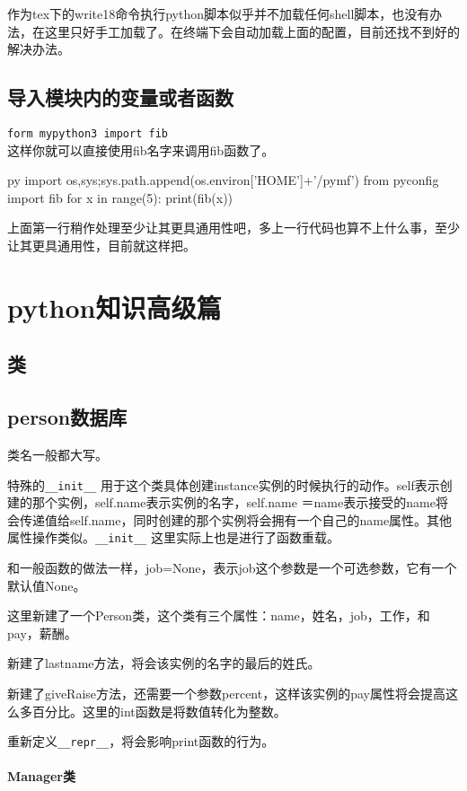 \documentclass[12pt,oneside]{book}
\begin{document}
\begin{common-format}
作为tex下的write18命令执行python脚本似乎并不加载任何shell脚本，也没有办法，在这里只好手工加载了。在终端下会自动加载上面的配置，目前还找不到好的解决办法。


\section{导入模块内的变量或者函数}
\verb+form mypython3 import fib+\\
这样你就可以直接使用fib名字来调用fib函数了。
\begin{xverbatim}[129]{py}
import os,sys;sys.path.append(os.environ['HOME']+'/pymf')
from pyconfig import fib
for x in range(5):
    print(fib(x))
\end{xverbatim}
上面第一行稍作处理至少让其更具通用性吧，多上一行代码也算不上什么事，至少让其更具通用性，目前就这样把。



\chapter{python知识高级篇}

\section{类}

\section{person数据库}

类名一般都大写。

特殊的\verb+__init__+ 用于这个类具体创建instance实例的时候执行的动作。self表示创建的那个实例，self.name表示实例的名字，self.name ＝name表示接受的name将会传递值给self.name，同时创建的那个实例将会拥有一个自己的name属性。其他属性操作类似。\verb+__init__+ 这里实际上也是进行了函数重载。

和一般函数的做法一样，job=None，表示job这个参数是一个可选参数，它有一个默认值None。

这里新建了一个Person类，这个类有三个属性：name，姓名，job，工作，和pay，薪酬。

新建了lastname方法，将会该实例的名字的最后的姓氏。

新建了giveRaise方法，还需要一个参数percent，这样该实例的pay属性将会提高这么多百分比。这里的int函数是将数值转化为整数。

重新定义\verb+__repr__+，将会影响print函数的行为。


\subsubsection{Manager类}


\end{common-format}
\end{document}
